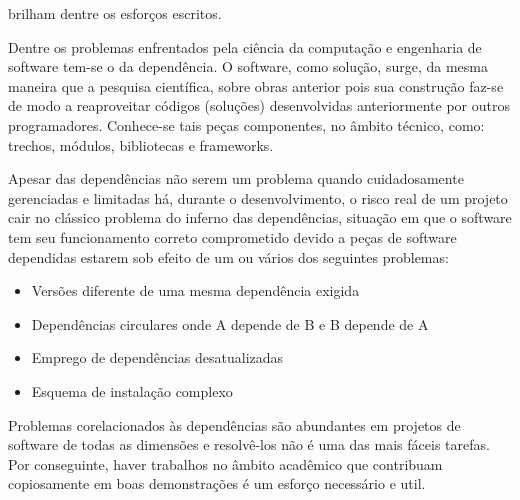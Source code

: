     brilham dentre os esforços escritos.

    Dentre os problemas enfrentados pela ciência da computação e engenharia de software
    tem-se o da dependência. O software, como solução, surge, da mesma maneira
    que a pesquisa científica, sobre obras anterior pois sua construção faz-se de modo
    a reaproveitar códigos (soluções) desenvolvidas anteriormente por outros programadores.
    Conhece-se tais peças componentes, no âmbito técnico, como: trechos, módulos,
    bibliotecas e frameworks. %

    Apesar das dependências não serem um problema quando cuidadosamente gerenciadas
    e limitadas há, durante o desenvolvimento, o risco real de um projeto cair no clássico
    problema do inferno das dependências, situação em que o software tem seu funcionamento
    correto comprometido devido a peças de software dependidas estarem sob efeito de um ou
    vários dos seguintes problemas:

    \begin{itemize}
      \item{Versões diferente de uma mesma dependência exigida}
      \item{Dependências circulares onde A depende de B e B depende de A}
      \item{Emprego de dependências desatualizadas}
      \item{Esquema de instalação complexo}
    \end{itemize}

    Problemas corelacionados às dependências são abundantes em projetos de software de todas
    as dimensões e resolvê-los não é uma das mais fáceis tarefas. Por conseguinte, haver trabalhos
    no âmbito acadêmico que contribuam copiosamente em boas demonstrações é um esforço
    necessário e util.


    
    
    
    

\newpage

